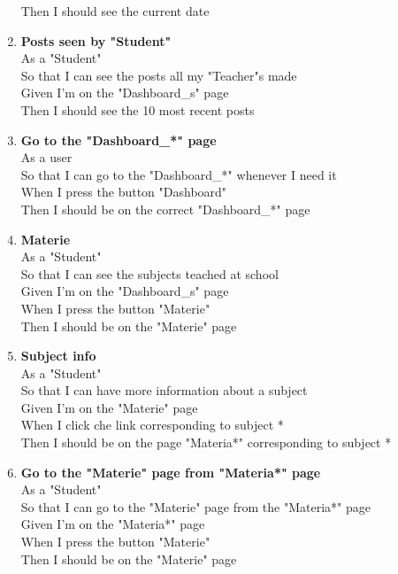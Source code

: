 \documentclass[Lau, binding=0.6cm, oneside]{sapthesis}
\begin{document}
\begin{enumerate}
			Then I should see the current date\\
	\item \textbf{Posts seen by "Student"}\\
			As a "Student"\\
			So that I can see the posts all my "Teacher"s made\\
			Given I’m on the "Dashboard\_s" page\\
			Then I should see the 10 most recent posts\\
	\item \textbf{Go to the "Dashboard\_*" page}\\
			As a user\\
			So that I can go to the "Dashboard\_*" whenever I need it\\
			When I press the button "Dashboard"\\
			Then I should be on the correct "Dashboard\_*" page\\
	\item \textbf{Materie}\\
			As a "Student"\\
			So that I can see the subjects teached at school\\
			Given I’m on the "Dashboard\_s" page\\
			When I press the button "Materie"\\
			Then I should be on the "Materie" page\\
	\item \textbf{Subject info}\\
			As a "Student"\\
			So that I can have more information about a subject\\
			Given I’m on the "Materie" page\\
			When I click che link corresponding to subject *\\
			Then I should be on the page "Materia*" corresponding to subject *\\
	\item \textbf{Go to the "Materie" page from "Materia*" page}\\
			As a "Student"\\
			So that I can go to the "Materie" page from the "Materia*" page\\
			Given I’m on the "Materia*" page\\
			When I press the button "Materie"\\
			Then I should be on the "Materie" page\\

\end{enumerate}
\end{document}
